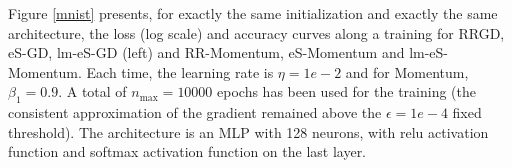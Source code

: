 \documentclass[article,authoryear,jmlmc]{beg_32}             %
\begin{document}
Figure \ref{mnist} presents, for exactly the same initialization and exactly the same architecture, the loss (log scale) and accuracy curves along a training for RRGD, eS-GD, lm-eS-GD (left) and RR-Momentum,
eS-Momentum and lm-eS-Momentum. Each time, the learning rate is $\eta = 1e-2$ and for Momentum, $\beta_1 = 0.9$. 
A total of $n_\max=10000$ epochs has been used for the training (the consistent approximation of the gradient remained above the $\epsilon = 1e-4$ fixed threshold). 
The architecture is an MLP with 128 neurons, with relu activation function and softmax activation function on the last layer.  

\end{document}
